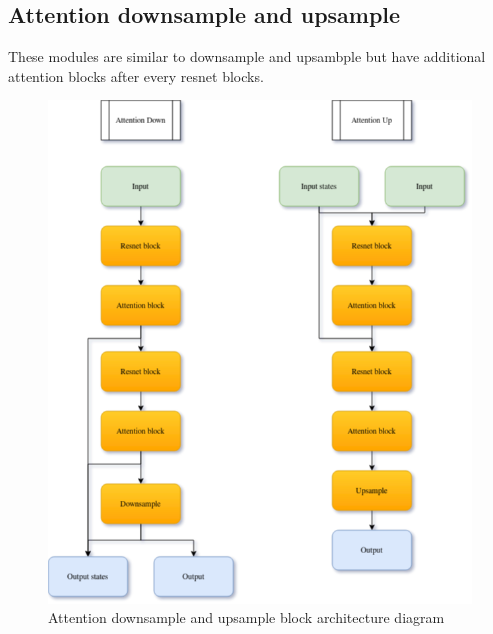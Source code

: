 \documentclass[11pt,a4paper]{report}
\begin{document}
\subsection{Attention downsample and upsample}
These modules are similar to downsample and upsambple but have additional attention blocks after every resnet blocks. 
\begin{figure}[H]
	\centering
	\includegraphics[scale=0.6]{images/AttentionDownUp.drawio}
    \caption{Attention downsample and upsample block architecture diagram}
\end{figure}
\end{document}
